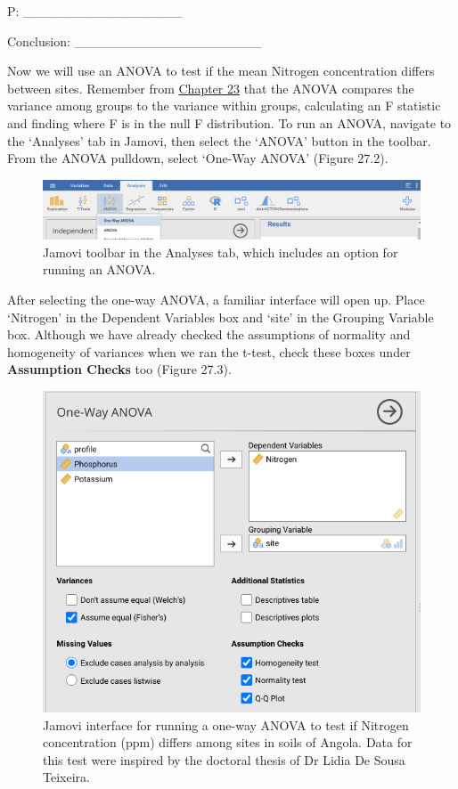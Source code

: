 \documentclass[
]{scrbook}
\begin{document}
P: \_\_\_\_\_\_\_\_\_\_\_\_\_\_\_\_\_

Conclusion: \_\_\_\_\_\_\_\_\_\_\_\_\_\_\_\_\_\_\_\_

Now we will use an ANOVA to test if the mean Nitrogen concentration differs between sites.
Remember from \protect\hyperlink{Chapter_23}{Chapter 23} that the ANOVA compares the variance among groups to the variance within groups, calculating an F statistic and finding where F is in the null F distribution.
To run an ANOVA, navigate to the `Analyses' tab in Jamovi, then select the `ANOVA' button in the toolbar.
From the ANOVA pulldown, select `One-Way ANOVA' (Figure 27.2).

\begin{figure}
\includegraphics[width=1\linewidth]{img/jamovi_one-way_ANOVA} \caption{Jamovi toolbar in the Analyses tab, which includes an option for running an ANOVA.}\label{fig:unnamed-chunk-126}
\end{figure}

After selecting the one-way ANOVA, a familiar interface will open up.
Place `Nitrogen' in the Dependent Variables box and `site' in the Grouping Variable box.
Although we have already checked the assumptions of normality and homogeneity of variances when we ran the t-test, check these boxes under \textbf{Assumption Checks} too (Figure 27.3).

\begin{figure}
\includegraphics[width=1\linewidth]{img/jamovi_one-way_ANOVA_analysis} \caption{Jamovi interface for running a one-way ANOVA to test if Nitrogen concentration (ppm) differs among sites in soils of Angola. Data for this test were inspired by the doctoral thesis of Dr Lidia De Sousa Teixeira.}\label{fig:unnamed-chunk-127}
\end{figure}
\end{document}
